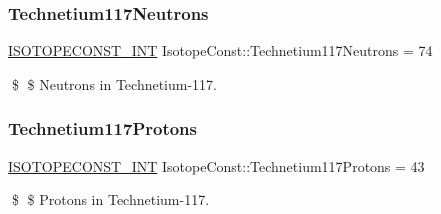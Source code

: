 \subsubsection{\texorpdfstring{Technetium117\+Neutrons}{Technetium117Neutrons}}
{\footnotesize\ttfamily \mbox{\hyperlink{group___isotope_const-_macros_ga5f18360b3e99483a35c32d789e62621c}{I\+S\+O\+T\+O\+P\+E\+C\+O\+N\+S\+T\+\_\+\+I\+NT}} Isotope\+Const\+::\+Technetium117\+Neutrons = 74}

\$ \$ Neutrons in Technetium-\/117. \mbox{\label{group___isotope_const-_technetium-_tc117_gadb9fa6feb0ea3583c81c6f8a2e508f56}} 
\subsubsection{\texorpdfstring{Technetium117\+Protons}{Technetium117Protons}}
{\footnotesize\ttfamily \mbox{\hyperlink{group___isotope_const-_macros_ga5f18360b3e99483a35c32d789e62621c}{I\+S\+O\+T\+O\+P\+E\+C\+O\+N\+S\+T\+\_\+\+I\+NT}} Isotope\+Const\+::\+Technetium117\+Protons = 43}

\$ \$ Protons in Technetium-\/117. 
